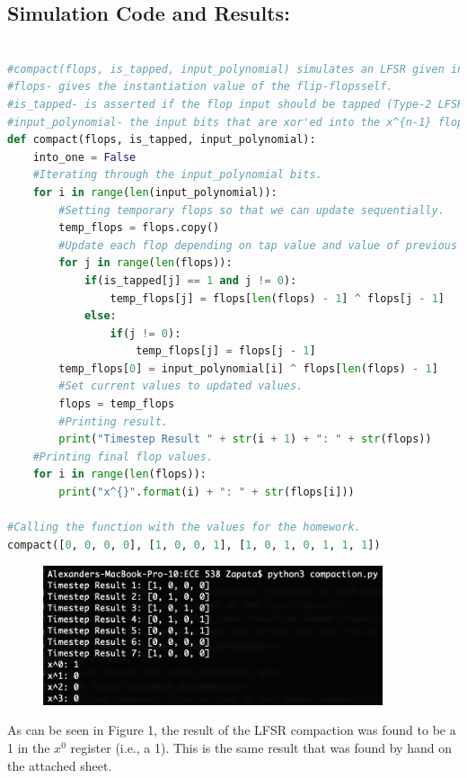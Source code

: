 \documentclass[letterpaper]{article} %
\begin{document}
\subsection*{Simulation Code and Results:}
\begin{lstlisting}[language=Python, caption=Python code used to simulate LFSR compaction]
	
#compact(flops, is_tapped, input_polynomial) simulates an LFSR given input params.
#flops- gives the instantiation value of the flip-flopsself.
#is_tapped- is asserted if the flop input should be tapped (Type-2 LFSR) high-order -> low-order.
#input_polynomial- the input bits that are xor'ed into the x^{n-1} flop in order.
def compact(flops, is_tapped, input_polynomial):
    into_one = False
    #Iterating through the input_polynomial bits.
    for i in range(len(input_polynomial)):
        #Setting temporary flops so that we can update sequentially.
        temp_flops = flops.copy()
        #Update each flop depending on tap value and value of previous flop.
        for j in range(len(flops)):
            if(is_tapped[j] == 1 and j != 0):
                temp_flops[j] = flops[len(flops) - 1] ^ flops[j - 1]
            else:
                if(j != 0):
                    temp_flops[j] = flops[j - 1]
        temp_flops[0] = input_polynomial[i] ^ flops[len(flops) - 1]
        #Set current values to updated values.
        flops = temp_flops
        #Printing result.
        print("Timestep Result " + str(i + 1) + ": " + str(flops))
    #Printing final flop values.
    for i in range(len(flops)):
        print("x^{}".format(i) + ": " + str(flops[i]))

#Calling the function with the values for the homework.
compact([0, 0, 0, 0], [1, 0, 0, 1], [1, 0, 1, 0, 1, 1, 1])
\end{lstlisting}

\begin{figure}[ht]
	\centering
	\includegraphics[width=10.0cm]{compaction_result.png}
\end{figure}
As can be seen in Figure 1, the result of the LFSR compaction was found to be a 1 in the $x^{0}$ register (i.e., a 1). This is the same result that was found by hand on the attached sheet.
\end{document}
